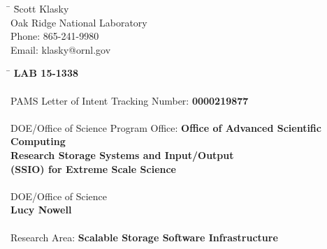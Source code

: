 
\begin{tabbing}
\hspace*{10mm} \=  \= Scott Klasky \\
\> \> Oak Ridge National Laboratory \\
\> \> Phone: 865-241-9980 \\
\> \> Email: klasky@ornl.gov
\end{tabbing}


\begin{tabbing}
\hspace*{10mm} \=  \= \textbf{LAB 15-1338}\\
\\
\> {PAMS Letter of Intent Tracking Number:}			    \> \textbf{0000219877}\\
\\
\> {DOE/Office of Science Program Office:} \> \textbf{Office of Advanced Scientific Computing}\\
\>									    \> \textbf{Research Storage Systems and Input/Output}\\
\>									    \> \textbf{(SSIO) for Extreme Scale Science}\\
\\
\> {DOE/Office of Science}  \> \\
\>  \>  \textbf{Lucy Nowell}\\
\\
\> {Research Area:} \>\textbf{Scalable Storage Software Infrastructure}

\end{tabbing}




\newpage
